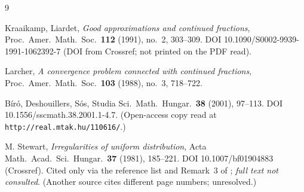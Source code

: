 \documentclass[11pt]{amsart}
\theoremstyle{remark}
\begin{document}
\begin{thebibliography}{9}

 Kraaikamp, Liardet, \emph{Good approximations and continued fractions},
Proc.\ Amer.\ Math.\ Soc.\ \textbf{112} (1991), no.~2, 303--309.
DOI 10.1090/S0002-9939-1991-1062392-7 (DOI from Crossref; not printed on the PDF read).

 Larcher, \emph{A convergence problem connected with continued fractions},
Proc.\ Amer.\ Math.\ Soc.\ \textbf{103} (1988), no.~3, 718--722.

 B\'ir\'o, Deshouillers, S\'os,
Studia Sci.\ Math.\ Hungar.\ \textbf{38} (2001), 97--113.
DOI 10.1556/sscmath.38.2001.1-4.7. (Open-access copy read at \texttt{http://real.mtak.hu/110616/}.)

 M. Stewart, \emph{Irregularities of uniform distribution},
Acta Math.\ Acad.\ Sci.\ Hungar.\ \textbf{37} (1981), 185--221.
DOI 10.1007/bf01904883 (Crossref). Cited only via the reference list and Remark~3 of \cite{KL};
\emph{full text not consulted}. (Another source cites different page numbers; unresolved.)

\end{thebibliography}
\end{document}
